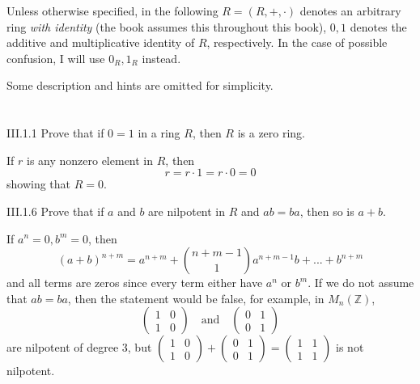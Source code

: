Unless otherwise specified, in the following $R = (R,+,\cdot)$ denotes an arbitrary ring \emph{with identity} (the book assumes this throughout this book), $0, 1$ denotes the additive and multiplicative identity of $R$, respectively. In the case of possible confusion, I will use $0_R, 1_R$ instead. 

Some description and hints are omitted for simplicity.

\section{}

\begin{problem}{III.1.1}
Prove that if $0 = 1$ in a ring $R$, then $R$ is a zero ring.
\end{problem}
\begin{pf}
If $r$ is any nonzero element in $R$, then
\[
r = r \cdot 1 = r \cdot 0 = 0  
\]
showing that $R = 0$.
\end{pf}
\begin{problem}{III.1.6}
Prove that if $a$ and $b$ are nilpotent in $R$ and $ab = ba$, then so is $a+b$.
\end{problem}
\begin{pf}
If $a^n = 0, b^m = 0$, then
\[
(a+b)^{n+m} = a^{n+m} +\binom{n+m-1}{1} a^{n+m-1}b + ... + b^{n+m}
\]
and all terms are zeros since every term either have $a^n$ or $b^m$. If we do not assume that $ab = ba$, then the statement would be false, for example, in $M_n(\mathbb{Z})$,
\[
\begin{pmatrix} 
1 & 0 \\
1 & 0
\end{pmatrix}
\quad \text{and} \quad
\begin{pmatrix} 
0 & 1 \\
0 & 1 
\end{pmatrix}
\]
are nilpotent of degree $3$, but
$\begin{pmatrix} 
1 & 0 \\
1 & 0
\end{pmatrix} + 
\begin{pmatrix} 
0 & 1 \\
0 & 1 
\end{pmatrix} = 
\begin{pmatrix} 
1 & 1 \\
1 & 1
\end{pmatrix}$ is not nilpotent.
\end{pf}

